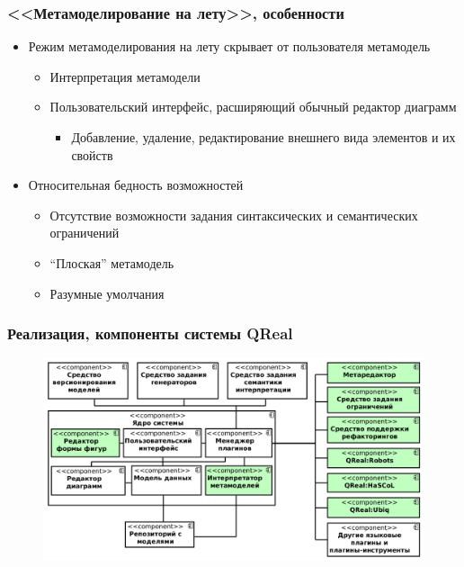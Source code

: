 \documentclass[14pt]{beamer}
\begin{document}
\begin{frame}
    \frametitle{<<Метамоделирование на лету>>, особенности}
    \begin{itemize}
        \item Режим метамоделирования на лету скрывает от пользователя метамодель
        \begin{itemize}
            \item Интерпретация метамодели
            \item Пользовательский интерфейс, расширяющий обычный редактор диаграмм
            \begin{itemize}
                \item Добавление, удаление, редактирование внешнего вида элементов и их свойств
            \end{itemize}
        \end{itemize}
        \item Относительная бедность возможностей
        \begin{itemize}
            \item Отсутствие возможности задания синтаксических и семантических ограничений
            \item ``Плоская'' метамодель
            \item Разумные умолчания
        \end{itemize}        
    \end{itemize}
\end{frame}

\begin{frame}
    \frametitle{Реализация, компоненты системы QReal}
    \begin{figure}
        \begin{center}
      		\includegraphics[width=\textwidth]{images/presentation/components.png}
        \end{center}
    \end{figure}
\end{frame}
\end{document}
